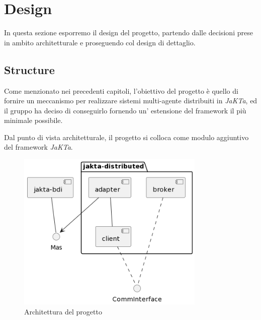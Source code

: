 \section{Design}




In questa sezione esporremo il design del progetto, partendo dalle decisioni prese in ambito architetturale e proseguendo
col design di dettaglio.

\subsection{Structure}

Come menzionato nei precedenti capitoli, l'obiettivo del progetto è quello di fornire un meccanismo per realizzare sistemi multi-agente distribuiti in \textit{JaKTa}, ed
il gruppo ha deciso di conseguirlo fornendo un' estensione del framework il più minimale possibile.

Dal punto di vista architetturale, il progetto si colloca come modulo aggiuntivo del framework \textit{JaKTa}.

\begin{figure}[h]
    \centering
    \includegraphics[width=0.8\textwidth]{figures/architecture.png}
    \caption{Architettura del progetto}
    \label{fig:architecture}
\end{figure}

